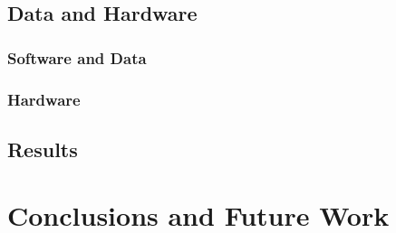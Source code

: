 \subsection{Data and Hardware}
\label{subsec:hardware}

\subsubsection{Software and Data}
\label{subsubsec:software}

\subsubsection{Hardware}
\label{subsubsec:hardware}

\subsection{Results}
\label{subsec:results}

\section{Conclusions and Future Work}
\label{sec:discussion_conclusion}

